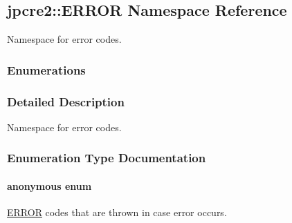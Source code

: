\hypertarget{namespacejpcre2_1_1ERROR}{}\subsection{jpcre2\+:\+:E\+R\+R\+OR Namespace Reference}
\label{namespacejpcre2_1_1ERROR}


Namespace for error codes.  


\subsubsection*{Enumerations}


\subsubsection{Detailed Description}
Namespace for error codes. 

\subsubsection{Enumeration Type Documentation}
\paragraph[{\texorpdfstring{anonymous enum}{anonymous enum}}]{\setlength{\rightskip}{0pt plus 5cm}anonymous enum}\hypertarget{namespacejpcre2_1_1ERROR_a4b2998984439438fa9da8d7043909bc2}{}\label{namespacejpcre2_1_1ERROR_a4b2998984439438fa9da8d7043909bc2}


\hyperlink{namespacejpcre2_1_1ERROR}{E\+R\+R\+OR} codes that are thrown in case error occurs. 


